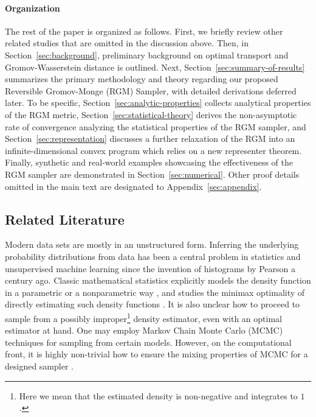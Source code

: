 \documentclass[11pt]{article}
\begin{document}
\paragraph{Organization}
The rest of the paper is organized as follows. First, we briefly review other related studies that are omitted in the discussion above. Then, in Section~\ref{sec:background}, preliminary background on optimal transport and Gromov-Wasserstein distance is outlined. Next, Section~\ref{sec:summary-of-results} summarizes the primary methodology and theory regarding our proposed Reversible Gromov-Monge (RGM) Sampler, with detailed derivations deferred later. To be specific, Section~\ref{sec:analytic-properties} collects analytical properties of the RGM metric, Section~\ref{sec:statistical-theory} derives the non-asymptotic rate of convergence analyzing the statistical properties of the RGM sampler, and Section~\ref{sec:representation} discusses a further relaxation of the RGM into an infinite-dimensional convex program which relies on a new representer theorem. Finally, synthetic and real-world examples showcasing the effectiveness of the RGM sampler are demonstrated in Section~\ref{sec:numerical}. Other proof details omitted in the main text are designated to Appendix~\ref{sec:appendix}.


\subsection{Related Literature}

Modern data sets are mostly in an unstructured form. Inferring the underlying probability distributions from data has been a central problem in statistics and unsupervised machine learning since the invention of histograms by Pearson a century ago. Classic mathematical statistics explicitly models the density function in a parametric or a nonparametric way \citep{silverman_1986, wasserman_2006}, and studies the minimax optimality of directly estimating such density functions \citep{stone_1982}. It is also unclear how to proceed to sample from a possibly improper\footnote{Here we mean that the estimated density is non-negative and integrates to $1$.} density estimator, even with an optimal estimator at hand. One may employ Markov Chain Monte Carlo (MCMC) techniques for sampling from certain models. However, on the computational front, it is highly non-trivial how to ensure the mixing properties of MCMC for a designed sampler \citep[Chapter~7]{robert_casella_2004}.
\end{document}
